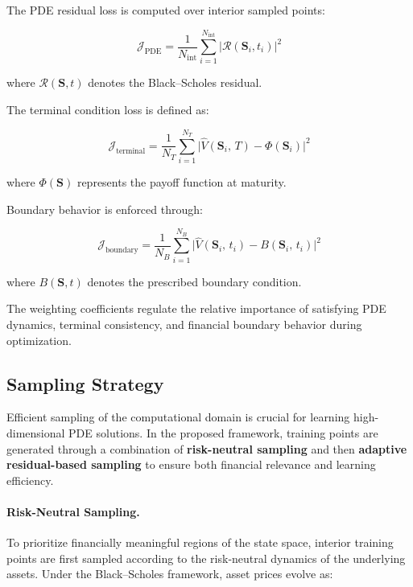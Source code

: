 \documentclass[12pt, a4paper]{article}
\begin{document}
The PDE residual loss is computed over interior sampled points:

\begin{equation}
    \mathcal{J}_{\mathrm{PDE}}
    = \frac{1}{N_{\mathrm{int}}} \sum_{i=1}^{N_{\mathrm{int}}}
      \bigl|\mathcal{R}(\mathbf{S}_i, t_i)\bigr|^2
    \label{eq:loss_pde}
\end{equation}

where $\mathcal{R}(\mathbf{S},t)$ denotes the Black--Scholes residual.

The terminal condition loss is defined as:

\begin{equation}
    \mathcal{J}_{\mathrm{terminal}}
    = \frac{1}{N_T} \sum_{i=1}^{N_T}
      \bigl|\hat{V}(\mathbf{S}_i,\,T) - \Phi(\mathbf{S}_i)\bigr|^2
    \label{eq:loss_terminal}
\end{equation}

where $\Phi(\mathbf{S})$ represents the payoff function at maturity.

Boundary behavior is enforced through:

\begin{equation}
    \mathcal{J}_{\mathrm{boundary}}
    = \frac{1}{N_B} \sum_{i=1}^{N_B}
      \bigl|\hat{V}(\mathbf{S}_i,\,t_i) - B(\mathbf{S}_i,\,t_i)\bigr|^2
    \label{eq:loss_boundary}
\end{equation}

where $B(\mathbf{S},t)$ denotes the prescribed boundary condition.

The weighting coefficients regulate the relative importance of
satisfying PDE dynamics, terminal consistency, and financial boundary
behavior during optimization.

\subsection{Sampling Strategy}

Efficient sampling of the computational domain is crucial for learning
high-dimensional PDE solutions. In the proposed framework, training
points are generated through a combination of \textbf{risk-neutral
sampling} and then \textbf{adaptive residual-based sampling} to ensure
both financial relevance and learning efficiency.

\paragraph{Risk-Neutral Sampling.}
To prioritize financially meaningful regions of the state space,
interior training points are first sampled according to the risk-neutral
dynamics of the underlying assets. Under the Black--Scholes framework,
asset prices evolve as:
\end{document}
